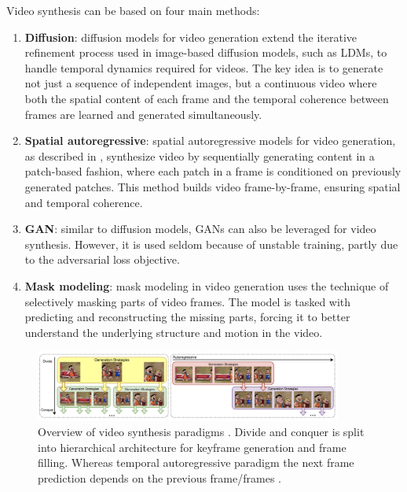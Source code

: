 Video synthesis can be based on four main methods:

\begin{enumerate}
    \item \textbf{Diffusion}: diffusion models for video generation extend the iterative refinement process used in image-based diffusion models, such as LDMs, to handle temporal dynamics required for videos. The key idea is to generate not just a sequence of independent images, but a continuous video where both the spatial content of each frame and the temporal coherence between frames are learned and generated simultaneously.
    \item \textbf{Spatial autoregressive}: spatial autoregressive models for video generation, as described in \cite{graves2013generating}, synthesize video by sequentially generating content in a patch-based fashion, where each patch in a frame is conditioned on previously generated patches. This method builds video frame-by-frame, ensuring spatial and temporal coherence.
    \item \textbf{GAN}: similar to diffusion models, GANs can also be leveraged for video synthesis. However, it is used seldom because of unstable training, partly due to the adversarial loss objective.
    \item \textbf{Mask modeling}: mask modeling in video generation uses the technique of selectively masking parts of video frames. The model is tasked with predicting and reconstructing the missing parts, forcing it to better understand the underlying structure and motion in the video.
\end{enumerate}

\begin{figure}
    \centering
    \includegraphics[width=0.9\textwidth]{images/video_synthesis/paradigms.png}
    \caption{Overview of video synthesis paradigms \cite{long_video_survey}. Divide and conquer is split into hierarchical architecture for keyframe generation and frame filling. Whereas temporal autoregressive paradigm the next frame prediction depends on the previous frame/frames \cite{long_video_survey}.}
    \label{fig:video_synthesis_paradigms}
\end{figure}

